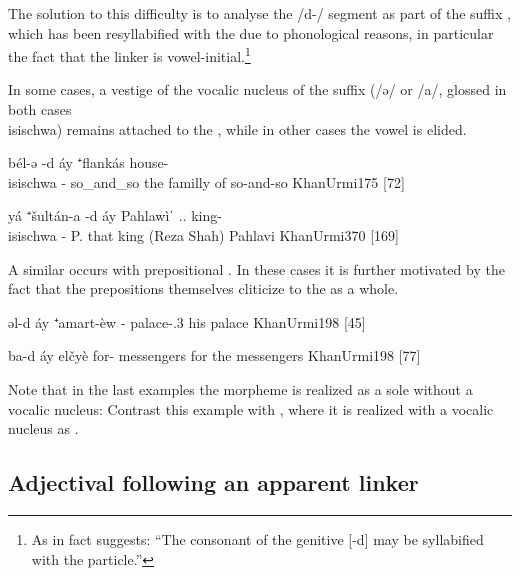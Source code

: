 The solution to this difficulty is to analyse the \ph/d-/ segment as part of the \cst* suffix \ed, which has been resyllabified with the \lnk* due to phonological reasons, in particular the fact that the linker is vowel-initial.\footnote{As \citet[175]{KhanUrmi} in fact suggests: \enquote{The consonant of the genitive  [-d] may be syllabified with the  particle.}}


 In some cases, a vestige of the vocalic nucleus of the \cst* suffix (\ph/ə/ or \ph/a/, glossed in both cases \\isi{schwa}) remains attached to the \prim, while in other cases the vowel is elided. 
 







{bél-ə -d\cb{} áy ⁺flankás}
{house-\\isi{schwa}{} -\cst\cb{} \lnk{} so\_and\_so}
{the familly of so-and-so}
{KhanUrmi}{175 {[72]}}

{yá ⁺šultán-a -d\cb{} áy {Pahlawi}̀ˈ}
{\dem.\near.\sg{} king-\\isi{schwa}{} -\cst\cb{} \lnk{} P.}
{that king (Reza Shah) Pahlavi}
{KhanUrmi}{370 {[169]}}


A similar   occurs with prepositional \prims. In these cases it is further motivated by the fact that the prepositions themselves cliticize to the \lnk* as a whole.

{əl-d\cb{} áy ⁺amart-èw}
{\acc-\cst\cb{} \lnk{} palace-\poss.3\masc}
{his palace\footnotemark}
{KhanUrmi}{198 {[45]}} 


{ba-d\cb{} áy elčyè}
{for-\cst\cb{} \lnk{} messengers}
{for the messengers}
{KhanUrmi}{198 {[77]}}

Note that in the last examples the \cst* morpheme is realized as a sole  without a vocalic nucleus: Contrast this example with , where it is realized with a vocalic nucleus as . 



\subsection{Adjectival \secns following an apparent linker} \label{ss:JUrm_apparant_adj_secns}

